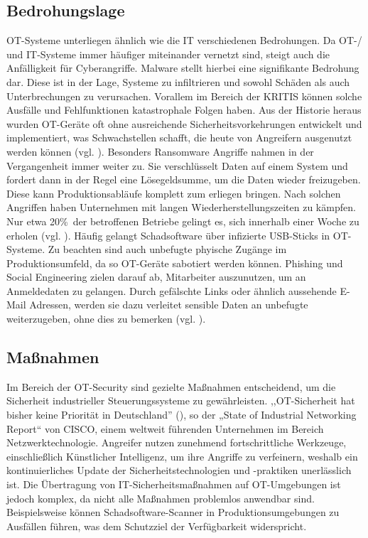 \subsection{Bedrohungslage}

OT-Systeme unterliegen ähnlich wie die IT verschiedenen Bedrohungen. Da OT-/ und IT-Systeme immer häufiger miteinander vernetzt sind, steigt auch die Anfälligkeit für Cyberangriffe. Malware stellt hierbei eine signifikante Bedrohung dar. Diese ist in der Lage, Systeme zu infiltrieren und sowohl Schäden als auch Unterbrechungen zu verursachen. Vorallem im Bereich der KRITIS können solche Ausfälle und Fehlfunktionen katastrophale Folgen haben. Aus der Historie heraus wurden OT-Geräte oft ohne ausreichende Sicherheitsvorkehrungen entwickelt und implementiert, was Schwachstellen schafft, die heute von Angreifern ausgenutzt werden können (vgl. \cite{avast}). Besonders Ransomware Angriffe nahmen in der Vergangenheit immer weiter zu. Sie verschlüsselt Daten auf einem System und fordert dann in der Regel eine Lösegeldsumme, um die Daten wieder freizugeben. Diese kann Produktionsabläufe komplett zum erliegen bringen. Nach solchen Angriffen haben Unternehmen mit langen Wiederherstellungszeiten zu kämpfen. Nur etwa 20\%\ der betroffenen Betriebe gelingt es, sich innerhalb einer Woche zu  erholen (vgl. \cite{secin}). Häufig gelangt Schadsoftware über infizierte USB-Sticks in OT-Systeme. Zu beachten sind auch unbefugte phyische Zugänge im Produktionsumfeld, da so OT-Geräte sabotiert werden können. Phishing und Social Engineering zielen darauf ab, Mitarbeiter auszunutzen, um an Anmeldedaten zu gelangen. Durch gefälschte Links oder ähnlich aussehende E-Mail Adressen, werden sie dazu verleitet sensible Daten an unbefugte weiterzugeben, ohne dies zu bemerken (vgl. \cite{bsibund}).  


\subsection{Maßnahmen}


Im Bereich der OT-Security sind gezielte Maßnahmen entscheidend, um die Sicherheit industrieller Steuerungssysteme zu gewährleisten. ,,OT-Sicherheit hat bisher keine Priorität in Deutschland'' (\cite{CISCO}), so der „State of Industrial Networking Report“ von CISCO, einem weltweit führenden Unternehmen im Bereich Netzwerktechnologie. Angreifer nutzen zunehmend fortschrittliche Werkzeuge, einschließlich Künstlicher Intelligenz, um ihre Angriffe zu verfeinern, weshalb ein kontinuierliches Update der Sicherheitstechnologien und -praktiken unerlässlich ist. Die Übertragung von IT-Sicherheitsmaßnahmen auf OT-Umgebungen ist jedoch komplex, da nicht alle Maßnahmen problemlos anwendbar sind. Beispielsweise können Schadsoftware-Scanner in Produktionsumgebungen zu Ausfällen führen, was dem Schutzziel der Verfügbarkeit widerspricht.

